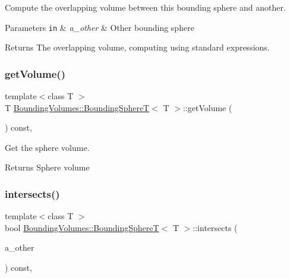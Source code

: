 Compute the overlapping volume between this bounding sphere and another. 


\begin{DoxyParams}[1]{Parameters}
\mbox{\tt in}  & {\em a\+\_\+other} & Other bounding sphere \\
\hline
\end{DoxyParams}
\begin{DoxyReturn}{Returns}
The overlapping volume, computing using standard expressions. 
\end{DoxyReturn}
\mbox{\label{classBoundingVolumes_1_1BoundingSphereT_a44e0069495c19069fced07aab8e614c6}} 
\subsubsection{\texorpdfstring{get\+Volume()}{getVolume()}}
{\footnotesize\ttfamily template$<$class T $>$ \\
T \hyperlink{classBoundingVolumes_1_1BoundingSphereT}{Bounding\+Volumes\+::\+Bounding\+SphereT}$<$ T $>$\+::get\+Volume (\begin{DoxyParamCaption}{ }\end{DoxyParamCaption}) const\hspace{0.3cm}{\ttfamily [inline]}, {\ttfamily [noexcept]}}



Get the sphere volume. 

\begin{DoxyReturn}{Returns}
Sphere volume 
\end{DoxyReturn}
\mbox{\label{classBoundingVolumes_1_1BoundingSphereT_a90baad0c400aac7645a7e8c1ab13096a}} 
\subsubsection{\texorpdfstring{intersects()}{intersects()}}
{\footnotesize\ttfamily template$<$class T $>$ \\
bool \hyperlink{classBoundingVolumes_1_1BoundingSphereT}{Bounding\+Volumes\+::\+Bounding\+SphereT}$<$ T $>$\+::intersects (\begin{DoxyParamCaption}\item[{const \hyperlink{classBoundingVolumes_1_1BoundingSphereT}{Bounding\+SphereT}$<$ T $>$ \&}]{a\+\_\+other }\end{DoxyParamCaption}) const\hspace{0.3cm}{\ttfamily [inline]}, {\ttfamily [noexcept]}}



